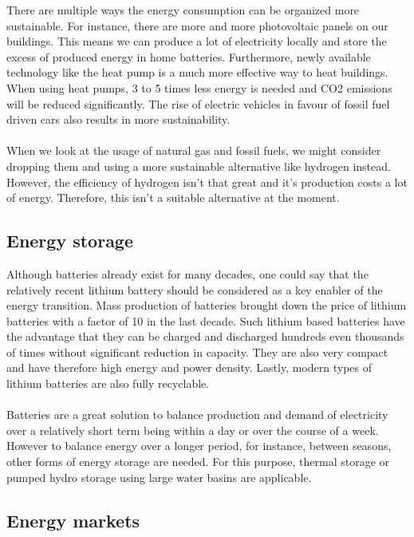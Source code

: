 \documentclass[../summary.tex]{subfiles}
\begin{document}
	There are multiple ways the energy consumption can be organized more sustainable. For instance, there are more and more photovoltaic panels on our buildings. This means we can produce a lot of electricity locally and store the excess of produced energy in home batteries. Furthermore, newly available technology like the heat pump is a much more effective way to heat buildings. When using heat pumps, 3 to 5 times less energy is needed and CO2 emissions will be reduced significantly. The rise of electric vehicles in favour of fossil fuel driven cars also results in more sustainability.
	\\\\
	When we look at the usage of natural gas and fossil fuels, we might consider dropping them and using a more sustainable alternative like hydrogen instead. However, the efficiency of hydrogen isn't that great and it's production costs a lot of energy. Therefore, this isn't a suitable alternative at the moment.
	
	\subsection{Energy storage}
	
	Although batteries already exist for many decades, one could say that the relatively recent lithium battery should be considered as a key enabler of the energy transition. Mass production of batteries brought down the price of lithium batteries with a factor of 10 in the last decade. Such lithium based batteries have the advantage that they can be charged and discharged hundreds even thousands of times without significant reduction in capacity. They are also very compact and have therefore high energy and power density. Lastly, modern types of lithium batteries are also fully recyclable. 
	\\\\
	Batteries are a great solution to balance production and demand of electricity over a relatively short term being within a day or over the course of a week. However to balance energy over a longer period, for instance, between seasons, other forms of energy storage are needed. For this purpose, thermal storage or pumped hydro storage using large water basins are applicable. 
	
	\subsection{Energy markets}
	
\end{document}
